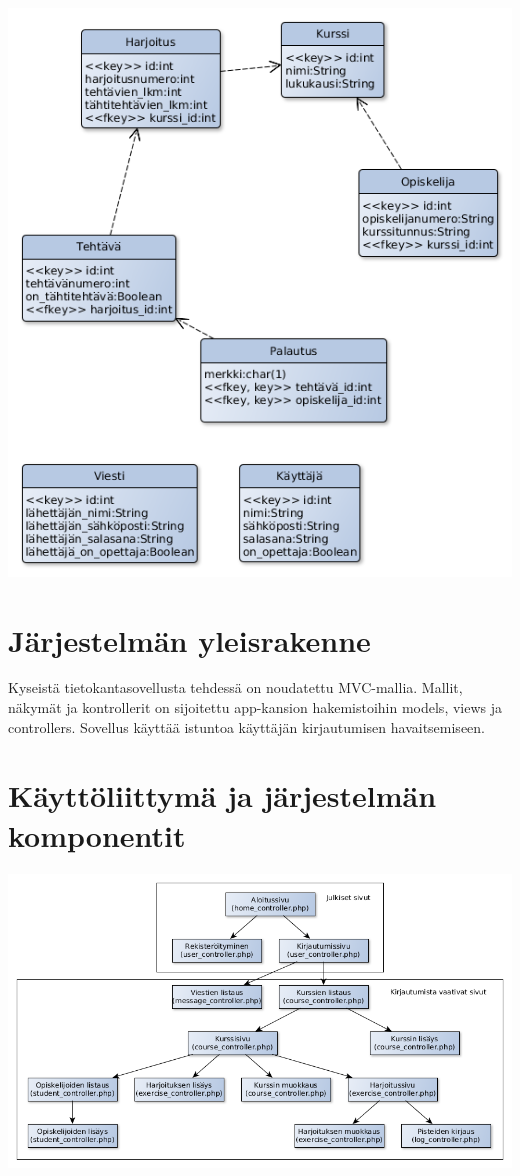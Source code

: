 \documentclass[a4paper,12pt, titlepage]{article}
\begin{document}
\includegraphics[scale=0.5]{relaatiokaavio}

\section{Järjestelmän yleisrakenne}

Kyseistä tietokantasovellusta tehdessä on noudatettu MVC-mallia.
Mallit, näkymät ja kontrollerit on sijoitettu app-kansion hakemistoihin models, views ja controllers.
Sovellus käyttää istuntoa käyttäjän kirjautumisen havaitsemiseen.

\section{Käyttöliittymä ja järjestelmän komponentit}

\includegraphics[scale=0.45]{kayttoliittyma}
\end{document}
